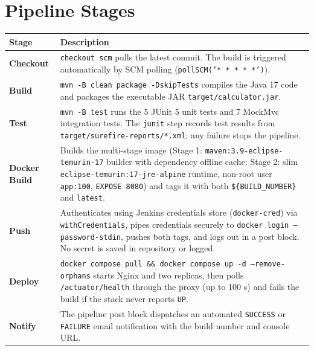 \documentclass[11pt,a4paper]{article}
\begin{document}
\vspace{-0.5em}

\section{Pipeline Stages}

\begin{table}[htbp]
\centering
\small
\begin{tabularx}{\textwidth}{l X}
\toprule
\textbf{Stage} & \textbf{Description} \\
\midrule
\textbf{Checkout} & \texttt{checkout scm} pulls the latest commit. The build is triggered automatically by SCM polling (\texttt{pollSCM('* * * * *')}). \\
\addlinespace[2pt]
\textbf{Build} & \texttt{mvn -B clean package -DskipTests} compiles the Java 17 code and packages the executable JAR \texttt{target/calculator.jar}. \\
\addlinespace[2pt]
\textbf{Test} & \texttt{mvn -B test} runs the 5 JUnit 5 unit tests and 7 MockMvc integration tests. The \texttt{junit} step records test results from \texttt{target/surefire-reports/*.xml}; any failure stops the pipeline. \\
\addlinespace[2pt]
\textbf{Docker Build} & Builds the multi-stage image (Stage 1: \texttt{maven:3.9-eclipse-temurin-17} builder with dependency offline cache; Stage 2: slim \texttt{eclipse-temurin:17-jre-alpine} runtime, non-root user \texttt{app:100}, \texttt{EXPOSE 8080}) and tags it with both \texttt{\$\{BUILD\_NUMBER\}} and \texttt{latest}. \\
\addlinespace[2pt]
\textbf{Push} & Authenticates using Jenkins credentials store (\texttt{docker-cred}) via \texttt{withCredentials}, pipes credentials securely to \texttt{docker login --password-stdin}, pushes both tags, and logs out in a post block. No secret is saved in repository or logged. \\
\addlinespace[2pt]
\textbf{Deploy} & \texttt{docker compose pull \&\& docker compose up -d --remove-orphans} starts Nginx and two replicas, then polls \texttt{/actuator/health} through the proxy (up to 100 s) and fails the build if the stack never reports \texttt{UP}. \\
\addlinespace[2pt]
\textbf{Notify} & The pipeline post block dispatches an automated \texttt{SUCCESS} or \texttt{FAILURE} email notification with the build number and console URL. \\
\bottomrule
\end{tabularx}
\end{table}
\end{document}
